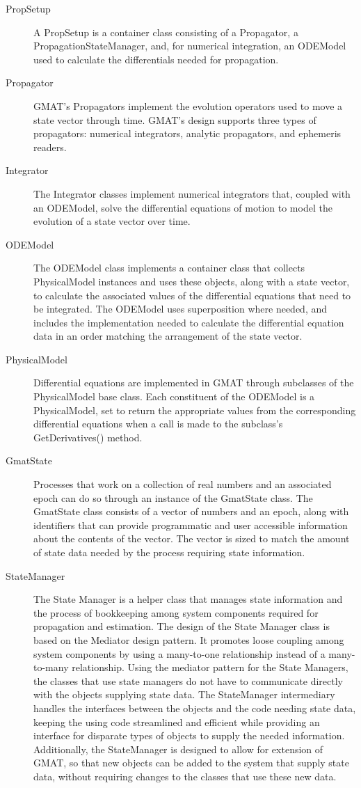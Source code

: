 \documentclass[10pt]{article}
\begin{document}
\begin{description}
\item[PropSetup]  A PropSetup is a container class consisting of a Propagator, a
PropagationStateManager, and, for numerical integration, an ODEModel used to calculate the
differentials needed for propagation.
\item[Propagator]  GMAT's Propagators implement the evolution operators used to move a state vector
through time.  GMAT's design supports three types of propagators: numerical integrators, analytic
propagators, and ephemeris readers.
\item[Integrator]  The Integrator classes implement numerical integrators that, coupled with an
ODEModel, solve the differential equations of motion to model the evolution of a state vector over
time.
\item[ODEModel]  The ODEModel class implements a container class that collects PhysicalModel
instances and uses these objects, along with a state vector, to calculate the associated values of
the differential equations that need to be integrated.  The ODEModel uses superposition where
needed, and includes the implementation needed to calculate the differential equation data in an
order matching the arrangement of the state vector.
\item[PhysicalModel]  Differential equations are implemented in GMAT through subclasses of the
PhysicalModel base class.  Each constituent of the ODEModel is a PhysicalModel, set to return the
appropriate values from the corresponding differential equations when a call is made to the
subclass's GetDerivatives() method.
\item[GmatState]  Processes that work on a collection of real numbers and an associated epoch can do
so through an instance of the GmatState class.  The GmatState class consists of a vector of numbers
and an epoch, along with identifiers that can provide programmatic and user accessible information
about the contents of the vector.  The vector is sized to match the amount of state data needed by
the process requiring state information.
\item[StateManager]  The State Manager is a helper class that manages state information and the
process of bookkeeping among system components required for propagation and estimation.  The design
of the State Manager class is based on the Mediator design pattern\cite{DesignPatterns}.  It
promotes loose coupling among system components by using a many-to-one relationship instead of a
many-to-many relationship.  Using the mediator pattern for the State Managers, the classes that use
state managers do not have to communicate directly with the objects supplying state data.  The
StateManager intermediary handles the interfaces between the objects and the code needing state
data, keeping the using code streamlined and efficient while providing an interface for disparate
types of objects to supply the needed information.  Additionally, the StateManager is designed to
allow for extension of GMAT, so that new objects can be added to the system that supply state data,
without requiring changes to the classes that use these new data.


\end{description}
\end{document}
